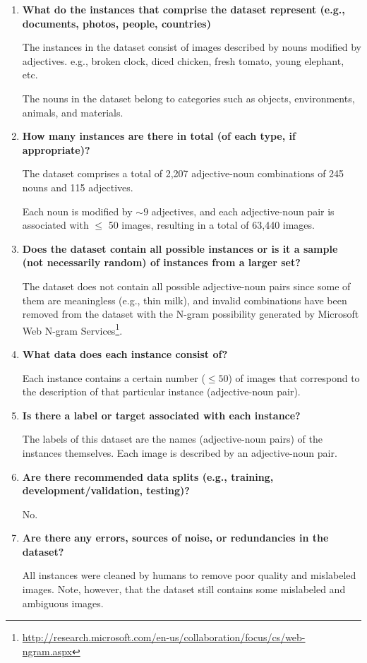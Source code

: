 \documentclass[a4paper,12pt]{article}
\begin{document}
\begin{enumerate}
    \item \textbf{What do the instances that comprise the dataset represent (e.g.,
    documents, photos, people, countries)}

    The instances in the dataset consist of images described by nouns modified by adjectives.
    e.g., broken clock, diced chicken, fresh tomato, young elephant, etc.

    
    The nouns in the dataset belong to categories such as objects, environments, animals, and materials.

    \item \textbf{How many instances are there in total (of each type, if appropriate)?}
    
    
    The dataset comprises a total of 2,207 adjective-noun combinations of 245 nouns and 115 adjectives. 
    
    Each noun is modified by $\sim 9$ adjectives, and each adjective-noun pair is associated with $\leq$ 50 images, 
    resulting in a total of 63,440 images.

    \item \textbf{Does the dataset contain all possible instances or is it a sample
    (not necessarily random) of instances from a larger set?}

    The dataset does not contain all possible adjective-noun pairs since some of them are meaningless (e.g., thin milk), and invalid combinations have been removed from the dataset with the N-gram possibility generated by Microsoft Web N-gram Services\footnote{\url{http://research.microsoft.com/en-us/collaboration/focus/cs/web-ngram.aspx}}. 

    \item \textbf{What data does each instance consist of?}
    
    Each instance contains a certain number ($\leq50$) of images that correspond to the description of that particular instance (adjective-noun pair).

    \item \textbf{Is there a label or target associated with each instance?}
    
    The labels of this dataset are the names (adjective-noun pairs) of the instances themselves. Each image is described by an adjective-noun pair.


    \item \textbf{Are there recommended data splits (e.g., training, development/validation,
    testing)?}

    No.

    \item \textbf{Are there any errors, sources of noise, or redundancies in the
    dataset?}

    All instances were cleaned by humans to remove poor quality and mislabeled images. Note, however, that the dataset still contains some mislabeled and ambiguous images.    

    
\end{enumerate}
\end{document}
